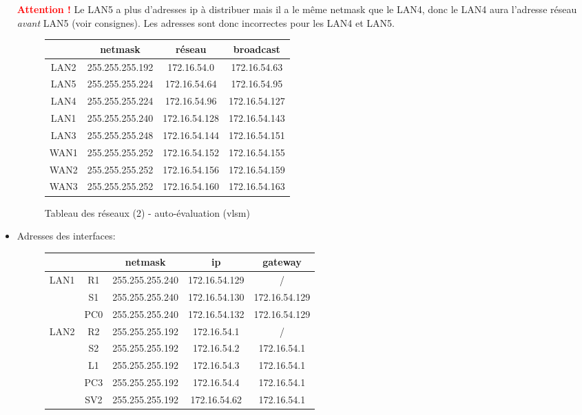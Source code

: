 \documentclass[a4paper]{article}
\begin{document}
\begin{itemize}
\textcolor{red}{\textbf{Attention !}} Le LAN5 a plus d'adresses ip à distribuer mais il a le même netmask que le LAN4, donc le LAN4 aura l'adresse réseau \textit{avant} LAN5 (voir consignes). Les adresses sont donc incorrectes pour les LAN4 et LAN5.
\begin{figure}[H]
    \centering
    \begin{tabular}{|c|c|c|c|} \hline
        &      netmask         & réseau        & broadcast     \\ \hline
        LAN2 & 255.255.255.192 & 172.16.54.0   & 172.16.54.63  \\
        LAN5 & 255.255.255.224 & 172.16.54.64  & 172.16.54.95  \\
        LAN4 & 255.255.255.224 & 172.16.54.96  & 172.16.54.127 \\
        LAN1 & 255.255.255.240 & 172.16.54.128 & 172.16.54.143 \\
        LAN3 & 255.255.255.248 & 172.16.54.144 & 172.16.54.151 \\
        WAN1 & 255.255.255.252 & 172.16.54.152 & 172.16.54.155 \\
        WAN2 & 255.255.255.252 & 172.16.54.156 & 172.16.54.159 \\
        WAN3 & 255.255.255.252 & 172.16.54.160 & 172.16.54.163 \\ \hline
    \end{tabular}
    \caption{Tableau des réseaux (2) - auto-évaluation (vlsm)}
    \label{}
\end{figure}





\item Adresses des interfaces:
\begin{figure}[H]
    \centering
    \begin{tabular}{|c|c| c |c|c|} \hline
        & & netmask & ip & gateway \\ \hline

        \multirow{3}{*}{LAN1}
        & R1  & 255.255.255.240 & 172.16.54.129 & / \\
        & S1  & 255.255.255.240 & 172.16.54.130 & 172.16.54.129 \\
        & PC0 & 255.255.255.240 & 172.16.54.132 & 172.16.54.129 \\ \hline

        \multirow{5}{*}{LAN2}
        & R2  & 255.255.255.192 & 172.16.54.1 & / \\
        & S2  & 255.255.255.192 & 172.16.54.2 & 172.16.54.1 \\
        & L1  & 255.255.255.192 & 172.16.54.3 & 172.16.54.1 \\
        & PC3 & 255.255.255.192 & 172.16.54.4 & 172.16.54.1 \\
        & SV2 & 255.255.255.192 & 172.16.54.62 & 172.16.54.1 \\ \hline


\end{tabular}
\end{figure}
\end{itemize}
\end{document}
